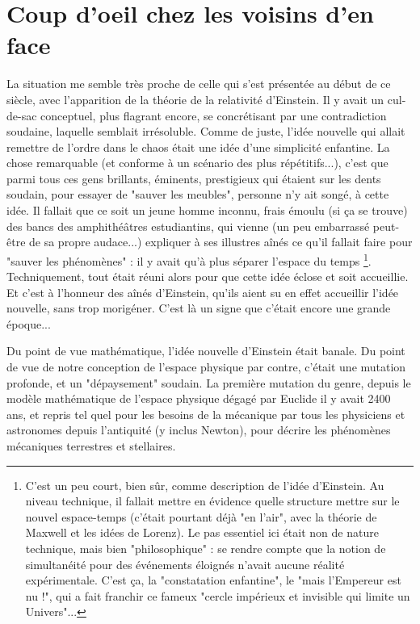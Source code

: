 \section{Coup d’oeil chez les voisins d’en face}

La situation me semble très proche de celle qui s'est présentée au début de ce siècle, avec l'apparition de la théorie de la relativité d'Einstein. Il y avait un cul-de-sac conceptuel, plus flagrant encore, se concrétisant par une contradiction soudaine, laquelle semblait irrésoluble. Comme de juste, l'idée nouvelle qui allait remettre de l'ordre dans le chaos était une idée d'une simplicité enfantine. La chose remarquable (et conforme à un scénario des plus répétitifs...), c'est que parmi tous ces gens brillants, éminents, prestigieux qui étaient sur les dents soudain, pour essayer de "sauver les meubles", personne n'y ait songé, à cette idée. Il fallait que ce soit un jeune homme inconnu, frais émoulu (si ça se trouve) des bancs des amphithéâtres estudiantins, qui vienne (un peu embarrassé peut-être de sa propre audace...) expliquer à ses illustres aînés ce qu'il fallait faire pour "sauver les phénomènes" : il y avait qu'à plus séparer l'espace du temps \footnote{C'est un peu court, bien sûr, comme description de l'idée d'Einstein. Au niveau technique, il fallait mettre en évidence quelle structure mettre sur le nouvel espace-temps (c'était pourtant déjà "en l'air", avec la théorie de Maxwell et les idées de Lorenz). Le pas essentiel ici était non de nature technique, mais bien "philosophique" : se rendre compte que la notion de simultanéité pour des événements éloignés n'avait aucune réalité expérimentale. C'est ça, la "constatation enfantine", le "mais l'Empereur est nu !", qui a fait franchir ce fameux "cercle impérieux et invisible qui limite un Univers"...}. Techniquement, tout était réuni alors pour que cette idée éclose et soit accueillie. Et c'est à l'honneur des aînés d'Einstein, qu'ils aient su en effet accueillir l'idée nouvelle, sans trop morigéner. C'est là un signe que c'était encore une grande époque...

Du point de vue mathématique, l'idée nouvelle d'Einstein était banale. Du point de vue de notre conception de l'espace physique par contre, c'était une mutation profonde, et un "dépaysement" soudain. La première mutation du genre, depuis le modèle mathématique de l'espace physique dégagé par Euclide il y avait 2400 ans, et repris tel quel pour les besoins de la mécanique par tous les physiciens et astronomes depuis l'antiquité (y inclus Newton), pour décrire les phénomènes mécaniques terrestres et stellaires.

